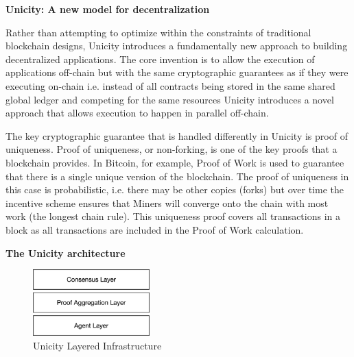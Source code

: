 \documentclass{article}
\begin{document}
\textbf{Unicity: A new model for decentralization}
\vspace{2mm}


Rather than attempting to optimize within the constraints of traditional blockchain designs, Unicity introduces a fundamentally new approach to building decentralized applications. The core invention is to allow the execution of applications off-chain but with the same cryptographic guarantees as if they were executing on-chain i.e. instead of all contracts being stored in the same shared global ledger and competing for the same resources Unicity introduces a novel approach that allows execution to happen in parallel off-chain. 
\vspace{2mm}

The key cryptographic guarantee that is handled differently in Unicity is proof of uniqueness. Proof of uniqueness, or non-forking, is one of the key proofs that a blockchain provides. In Bitcoin, for example, Proof of Work is used to guarantee that there is a single unique version of the blockchain. The proof of uniqueness in this case is probabilistic, i.e. there may be other copies (forks) but over time the incentive scheme ensures that Miners will converge onto the chain with most work (the longest chain rule). This uniqueness proof covers all transactions in a block as all transactions are included in the Proof of Work calculation. 

\vspace{2mm}

\textbf{The Unicity architecture}



\begin{figure}[htbp]
    \centering
    \includegraphics[width=0.4\textwidth]{ThreeLayers.png}
    \caption{Unicity Layered Infrastructure}
    \label{fig:layers}
\end{figure}
\end{document}

